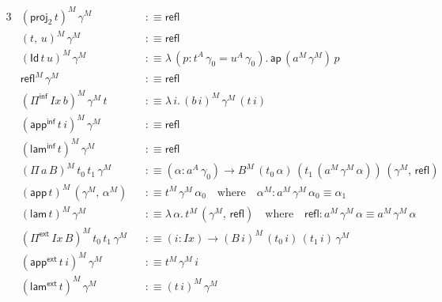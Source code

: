 \documentclass[12pt,a4paper,twoside,openany]{book}
\theoremstyle{remark}
\theoremstyle{definition}
\theoremstyle{theorem}
\newcommand{\mi}[1]{\mathit{#1}}
\newcommand{\ms}[1]{\mathsf{#1}}
\newcommand{\ap}{\ms{ap}}
\newcommand{\refl}{\mathsf{refl}}
\newcommand{\Id}{\mathsf{Id}}
\newcommand{\proj}{\mathsf{proj}}
\newcommand{\Pie}{\Pi^{\mathsf{ext}}}
\newcommand{\appe}{\mathsf{app^{ext}}}
\newcommand{\lame}{\mathsf{lam^{ext}}}
\newcommand{\Piinf}{\Pi^{\mathsf{inf}}}
\newcommand{\appinf}{\mathsf{app^{inf}}}
\newcommand{\laminf}{\mathsf{lam^{inf}}}
\newcommand{\app}{\ms{app}}
\newcommand{\lam}{\ms{lam}}
\newcommand{\defn}{:\equiv}
\begin{document}
\begin{alignat*}{3}
  &(\proj_2\,t)^M\,\gamma^M &&\defn \refl\\
  &(t,\,u)^M\,\gamma^M &&\defn \refl \\
  &(\Id\,t\,u)^M\,\gamma^M &&\defn \lambda\,(p : t^A\,\gamma_0 = u^A\,\gamma_0).\,\ap\,(a^M\,\gamma^M)\,p\\
  &\refl^M\,\gamma^M &&\defn \refl\\
  &(\Piinf\,\mi{Ix}\,b)^M\,\gamma^M\,t &&\defn \lambda\,i.\,(b\,i)^M\,\gamma^M\,(t\,i)\\
  &(\appinf\,t\,i)^M\,\gamma^M &&\defn \refl \\
  &(\laminf\,t)^M\,\gamma^M &&\defn \refl \\
  &(\Pi\,a\,B)^M\,t_0\,t_1\,\gamma^M &&\defn (\alpha : a^A\,\gamma_0) \to B^M\,(t_0\,\alpha)\,(t_1\,(a^M\,\gamma^M\,\alpha))\,(\gamma^M,\,\refl)\\
  &(\app\,t)^M\,(\gamma^M,\,\alpha^M) &&\defn t^M\,\gamma^M\,\alpha_0\hspace{1em}\text{where}\hspace{1em} \alpha^M : a^M\,\gamma^M\,\alpha_0 \equiv \alpha_1\\
  &(\lam\,t)^M\,\gamma^M &&\defn \lambda\,\alpha.\,t^M\,(\gamma^M,\,\refl)\hspace{1em}\text{where}\hspace{1em} \refl : a^M\,\gamma^M\,\alpha \equiv a^M\,\gamma^M\,\alpha\\
  &(\Pie\,\mi{Ix}\,B)^M\,t_0\,t_1\,\gamma^M &&\defn (i : \mi{Ix}) \to (B\,i)^M\,(t_0\,i)\,(t_1\,i)\,\gamma^M\\
  &(\appe\,t\,i)^M\,\gamma^M &&\defn t^M\,\gamma^M\,i\\
  &(\lame\,t)^M\,\gamma^M &&\defn (t\,i)^M\,\gamma^M
\end{alignat*}
\end{document}

